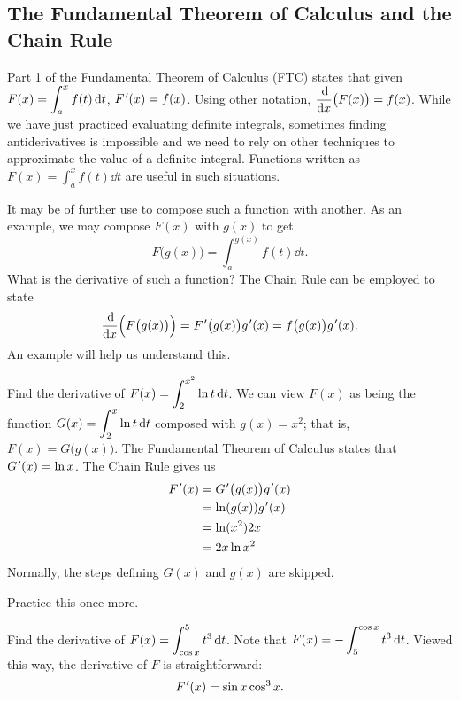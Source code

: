 \subsection{The Fundamental Theorem of Calculus and the Chain Rule}

Part 1 of the Fundamental Theorem of Calculus (FTC) states that given $\displaystyle F(x) = \int_a^x f(t)\operatorname{d}\! t$,  $\Fp(x) = f(x)$. Using other notation, $\displaystyle \frac{\operatorname{d}\!}{\operatorname{d}\! x}\bigl(F(x)\bigr) = f(x)$. While we have just practiced evaluating definite integrals, sometimes finding antiderivatives is impossible and we need to rely on other techniques to approximate the value of a definite integral. Functions written as $F(x) = \int_a^x f(t)\dd t$ are useful in such situations.

It may be of further use to compose such a function with another. As an example, we may compose $F(x)$ with $g(x)$ to get
\[F\bigl(g(x)\bigr) = \int_a^{g(x)} f(t)\dd t.\]
What is the derivative of such a function? The Chain Rule can be employed to state
\[
\frac{\dd}{\dd x}\Bigl(F\bigl(g(x)\bigr)\Bigr) = \Fp\bigl(g(x)\bigr)g\primeskip'(x)
= f\bigl(g(x)\bigr)g\primeskip'(x).
\]
An example will help us understand this.

\begin{example}\label{ex_ftc11}%
Find the derivative of $\displaystyle F(x) = \int_2^{x^2} \ln t\operatorname{d}\! t$.
\solution
We can view $F(x)$ as being the function $\displaystyle G(x) = \int_2^x \ln t\operatorname{d}\! t$ composed with $g(x) = x^2$; that is, $F(x) = G\bigl(g(x)\bigr)$. The Fundamental Theorem of Calculus states that $G\primeskip'(x) = \ln x$. The Chain Rule gives us 
\begin{align*}
F\primeskip'(x) &= G\primeskip'\bigl(g(x)\bigr) g\primeskip'(x) \\
 			&= \ln (g(x)) g\primeskip'(x) \\
 			&= \ln (x^2) 2x \\
 			&=2x\ln x^2
\end{align*}
Normally, the steps defining $G(x)$ and $g(x)$ are skipped.
\end{example}

Practice this once more.

\begin{example}\label{ex_ftc12}%
Find the derivative of $\displaystyle F(x) = \int_{\cos x}^5 t^3\operatorname{d}\! t$.
\solution
Note that $\displaystyle F(x) = -\int_5^{\cos x} t^3\operatorname{d}\! t$. Viewed this way, the derivative of $F$ is straightforward:
\[F\primeskip'(x) = \sin x \cos^3 x.\]
\end{example}

